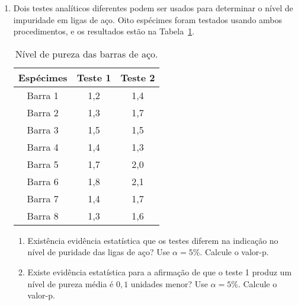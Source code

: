 \documentclass[8pt, a4paper]{article}
\begin{document}
\begin{enumerate}
	\item Dois testes analíticos diferentes podem ser usados para determinar o nível de impuridade em ligas de aço. Oito espécimes foram testados usando ambos procedimentos, e os resultados estão na Tabela~\ref{tab:especimes}.
	\begin{table}[ht]
		\centering
		\begin{tabular}{c|cc}
			\toprule[0.05cm]
			Espécimes & Teste 1 & Teste 2 \\ 
			\midrule[0.025cm]
			Barra 1 & 1,2 & 1,4 \\ 
			Barra 2 & 1,3 & 1,7 \\ 
			Barra 3 & 1,5 & 1,5 \\ 
			Barra 4 & 1,4 & 1,3 \\ 
			Barra 5 & 1,7 & 2,0 \\ 
			Barra 6 & 1,8 & 2,1 \\ 
			Barra 7 & 1,4 & 1,7 \\ 
			Barra 8 & 1,3 & 1,6 \\ 
			\bottomrule[0.05cm]
		\end{tabular}
		\caption{Nível de pureza das barras de aço.} 
		\label{tab:especimes}
	\end{table} 
	\begin{enumerate}
		\item Existência evidência estatística que os testes diferem na indicação no nível de puridade das ligas de aço? Use $\alpha = 5\%$. Calcule o valor-p. 
		\item Existe evidência estatística para a afirmação de que o teste 1 produz um nível de pureza média é $0,1$ unidades menor? Use $\alpha = 5\%$. Calcule o valor-p. 
	\end{enumerate}


\end{enumerate}
\end{document}

